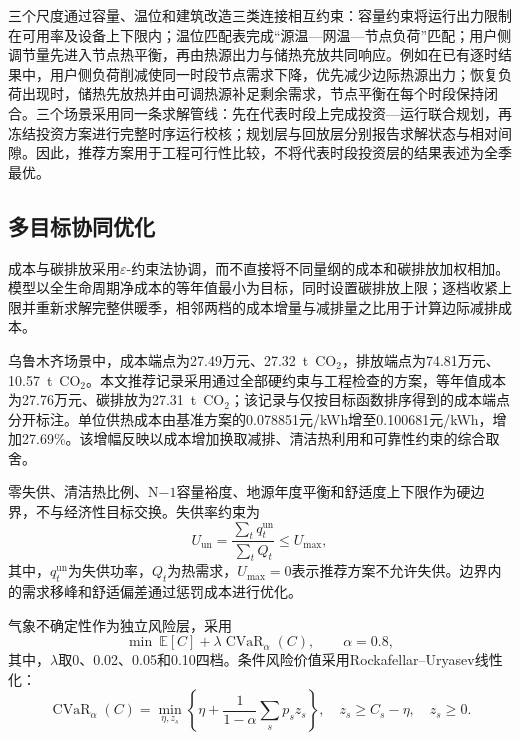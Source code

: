 三个尺度通过容量、温位和建筑改造三类连接相互约束：容量约束将运行出力限制在可用率及设备上下限内；温位匹配表完成“源温---网温---节点负荷”匹配；用户侧调节量先进入节点热平衡，再由热源出力与储热充放共同响应。例如在已有逐时结果中，用户侧负荷削减使同一时段节点需求下降，优先减少边际热源出力；恢复负荷出现时，储热先放热并由可调热源补足剩余需求，节点平衡在每个时段保持闭合。三个场景采用同一条求解管线：先在代表时段上完成投资---运行联合规划，再冻结投资方案进行完整时序运行校核；规划层与回放层分别报告求解状态与相对间隙。因此，推荐方案用于工程可行性比较，不将代表时段投资层的结果表述为全季最优。

\subsection{多目标协同优化}

成本与碳排放采用$\varepsilon$-约束法协调，而不直接将不同量纲的成本和碳排放加权相加。模型以全生命周期净成本的等年值最小为目标，同时设置碳排放上限；逐档收紧上限并重新求解完整供暖季，相邻两档的成本增量与减排量之比用于计算边际减排成本。

乌鲁木齐场景中，成本端点为27.49万元、27.32~t~CO$_2$，排放端点为74.81万元、10.57~t~CO$_2$。本文推荐记录采用通过全部硬约束与工程检查的方案，等年值成本为27.76万元、碳排放为27.31~t~CO$_2$；该记录与仅按目标函数排序得到的成本端点分开标注。单位供热成本由基准方案的0.078851元/kWh增至0.100681元/kWh，增加27.69\%。该增幅反映以成本增加换取减排、清洁热利用和可靠性约束的综合取舍。

零失供、清洁热比例、N$-1$容量裕度、地源年度平衡和舒适度上下限作为硬边界，不与经济性目标交换。失供率约束为
\begin{equation}
U_{\mathrm{un}}=\frac{\sum_t q_t^{\mathrm{un}}}{\sum_t Q_t}\leq U_{\max},
\label{eq:alg-unserved}
\end{equation}
其中，$q_t^{\mathrm{un}}$为失供功率，$Q_t$为热需求，$U_{\max}=0$表示推荐方案不允许失供。边界内的需求移峰和舒适偏差通过惩罚成本进行优化。

气象不确定性作为独立风险层，采用
\begin{equation}
\min\ \mathbb{E}[C]+\lambda\operatorname{CVaR}_{\alpha}(C),
\qquad \alpha=0.8,
\label{eq:alg-risk-objective}
\end{equation}
其中，$\lambda$取0、0.02、0.05和0.10四档。条件风险价值采用Rockafellar--Uryasev线性化：
\begin{equation}
\operatorname{CVaR}_{\alpha}(C)=\min_{\eta,z_s}\left\{\eta+\frac{1}{1-\alpha}\sum_s p_sz_s\right\},
\quad z_s\geq C_s-\eta,\quad z_s\geq0.
\label{eq:alg-cvar}
\end{equation}

